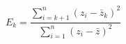 \documentclass[12pt]{article}
\begin{document}
\pagestyle{empty}
\large
{}
\pagecolor{ehandbook}

\[
E_{k} = \frac{\sum_{i=k+1}^{n}{(z_{i} - \bar{z}_{k})^{2}}}
  {\sum_{i=1}^{n}{(z_{i} - \bar{z})^{2}}}
\]
\end{document}
